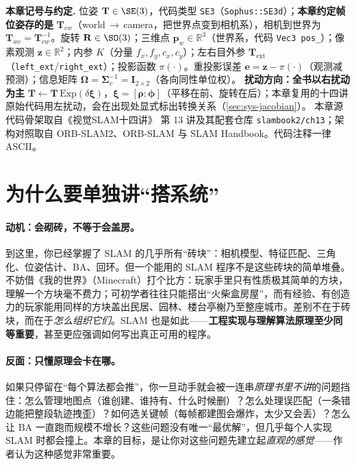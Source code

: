 \begin{note}
\textbf{本章记号与约定.}\;
位姿 $\mathbf{T}\in\SE(3)$，代码类型 \texttt{SE3}（\texttt{Sophus::SE3d}）；\textbf{本章约定帧位姿存的是} $\mathbf{T}_{cw}$（world\,$\to$\,camera，把世界点变到相机系），相机到世界为 $\mathbf{T}_{wc}=\mathbf{T}_{cw}^{-1}$。旋转 $\mathbf{R}\in\SO(3)$；三维点 $\mathbf{p}_w\in\mathbb{R}^3$（世界系，代码 \texttt{Vec3 pos\_}）；像素观测 $\mathbf{z}\in\mathbb{R}^2$；内参 $K$（分量 $f_x,f_y,c_x,c_y$）；左右目外参 $\mathbf{T}_{\mathrm{ext}}$（\texttt{left\_ext}/\allowbreak\texttt{right\_ext}）；投影函数 $\pi(\cdot)$。重投影误差 $\mathbf{e}=\mathbf{z}-\pi(\cdot)$（观测减预测）；信息矩阵 $\boldsymbol\Omega=\boldsymbol\Sigma_v^{-1}=\mathbf{I}_{2\times2}$（各向同性单位权）。
\textbf{扰动方向：全书以右扰动为主} $\mathbf{T}\leftarrow\mathbf{T}\,\mathrm{Exp}(\delta\boldsymbol\xi)$，$\boldsymbol\xi=[\boldsymbol\rho;\boldsymbol\phi]$（平移在前、旋转在后）；本章复用的十四讲原始代码用左扰动，会在出现处显式标出转换关系（\cref{sec:sys-jacobian}）。
本章源代码骨架取自《视觉SLAM十四讲》\cite{gaoxiang2019slam14} 第 13 讲及其配套仓库 \texttt{slambook2/\allowbreak ch13}；架构对照取自 ORB-SLAM2\cite{murartal2017orbslam2}、ORB-SLAM\cite{murartal2015orbslam} 与 SLAM Handbook\cite{carlone2026handbook}。代码注释一律 ASCII。
\end{note}

\section{为什么要单独讲“搭系统”}
\label{sec:sys-why}

\paragraph{动机：会砌砖，不等于会盖房。}
到这里，你已经掌握了 SLAM 的几乎所有“砖块”：相机模型、特征匹配、三角化、位姿估计、BA、回环。但一个能用的 SLAM 程序不是这些砖块的简单堆叠。不妨借《我的世界》（Minecraft）打个比方\cite{gaoxiang2019slam14}：玩家手里只有性质极其简单的方块，理解一个方块毫不费力；可初学者往往只能搭出“火柴盒房屋”，而有经验、有创造力的玩家能用同样的方块盖出民居、园林、楼台亭榭乃至整座城市。差别不在于砖块，而在于\emph{怎么组织它们}。SLAM 也是如此——\textbf{工程实现与理解算法原理至少同等重要}，甚至更应强调如何写出真正可用的程序。

\paragraph{反面：只懂原理会卡在哪。}
如果只停留在“每个算法都会推”，你一旦动手就会被一连串\emph{原理书里不讲}的问题挡住：怎么管理地图点（谁创建、谁持有、什么时候删）？怎么处理误匹配（一条错边能把整段轨迹拽歪）？如何选关键帧（每帧都建图会爆炸，太少又会丢）？怎么让 BA 一直跑而规模不增长？这些问题没有唯一“最优解”，但几乎每个人实现 SLAM 时都会撞上。本章的目标，是让你对这些问题先建立起\emph{直观的感觉}——作者认为这种感觉非常重要。

